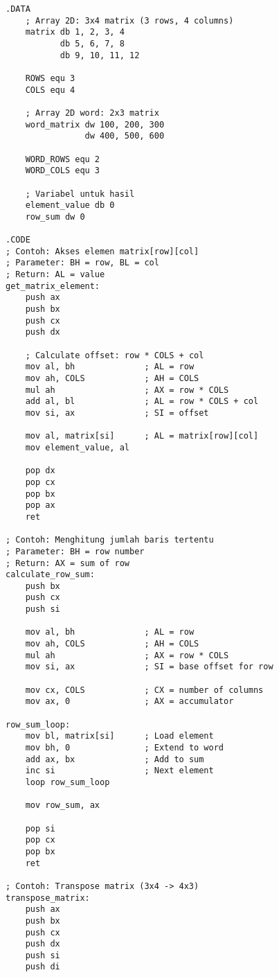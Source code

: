 \documentclass[../main.tex]{subfiles}
\begin{document}
                \begin{lstlisting}[language={[x86masm]Assembler}, caption=Operasi Array Multi Dimensi, label={lst:multi-dim-array}]
.DATA
    ; Array 2D: 3x4 matrix (3 rows, 4 columns)
    matrix db 1, 2, 3, 4
           db 5, 6, 7, 8
           db 9, 10, 11, 12
    
    ROWS equ 3
    COLS equ 4
    
    ; Array 2D word: 2x3 matrix
    word_matrix dw 100, 200, 300
                dw 400, 500, 600
    
    WORD_ROWS equ 2
    WORD_COLS equ 3
    
    ; Variabel untuk hasil
    element_value db 0
    row_sum dw 0

.CODE
; Contoh: Akses elemen matrix[row][col]
; Parameter: BH = row, BL = col
; Return: AL = value
get_matrix_element:
    push ax
    push bx
    push cx
    push dx
    
    ; Calculate offset: row * COLS + col
    mov al, bh              ; AL = row
    mov ah, COLS            ; AH = COLS
    mul ah                  ; AX = row * COLS
    add al, bl              ; AL = row * COLS + col
    mov si, ax              ; SI = offset
    
    mov al, matrix[si]      ; AL = matrix[row][col]
    mov element_value, al
    
    pop dx
    pop cx
    pop bx
    pop ax
    ret

; Contoh: Menghitung jumlah baris tertentu
; Parameter: BH = row number
; Return: AX = sum of row
calculate_row_sum:
    push bx
    push cx
    push si
    
    mov al, bh              ; AL = row
    mov ah, COLS            ; AH = COLS
    mul ah                  ; AX = row * COLS
    mov si, ax              ; SI = base offset for row
    
    mov cx, COLS            ; CX = number of columns
    mov ax, 0               ; AX = accumulator
    
row_sum_loop:
    mov bl, matrix[si]      ; Load element
    mov bh, 0               ; Extend to word
    add ax, bx              ; Add to sum
    inc si                  ; Next element
    loop row_sum_loop
    
    mov row_sum, ax
    
    pop si
    pop cx
    pop bx
    ret

; Contoh: Transpose matrix (3x4 -> 4x3)
transpose_matrix:
    push ax
    push bx
    push cx
    push dx
    push si
    push di
    

\end{lstlisting}
\end{document}
